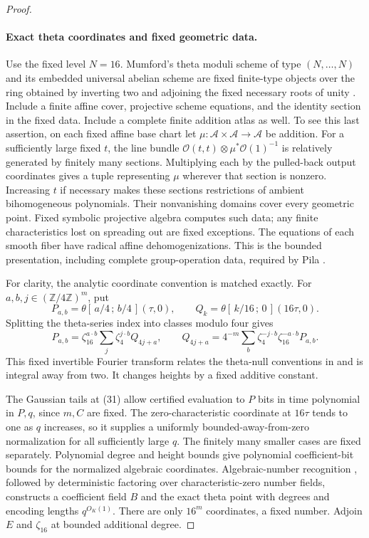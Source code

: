 \documentclass[11pt]{article}
\theoremstyle{definition}
\theoremstyle{remark}
\begin{document}
\begin{proof}
\paragraph{Exact theta coordinates and fixed geometric data.}
Use the fixed level $N=16$.  Mumford's theta moduli scheme of type
$(N,\ldots,N)$ and its embedded universal abelian scheme are fixed
finite-type objects over the ring obtained by inverting two and adjoining
the fixed necessary roots of unity
\cite[Section 6, pp.~76--84]{Mumford1967}.  Include a finite affine cover,
projective scheme equations, and the identity section in the fixed data.
Include a complete finite addition atlas as well.  To see this last
assertion, on each fixed affine base chart let
$\mu:\mathcal A\times\mathcal A\to\mathcal A$ be addition.
For a sufficiently large fixed $t$, the line bundle
$\mathcal O(t,t)\otimes\mu^*\mathcal O(1)^{-1}$ is relatively generated by
finitely many sections.  Multiplying each by the pulled-back output
coordinates gives a tuple representing $\mu$ wherever that section is
nonzero.  Increasing $t$ if necessary makes these sections restrictions of
ambient bihomogeneous polynomials.  Their nonvanishing domains cover every
geometric point.  Fixed symbolic projective algebra computes such data;
any finite characteristics lost on spreading out are fixed exceptions.
The equations of each smooth fiber have radical affine dehomogenizations.
This is the bounded presentation, including complete group-operation data,
required by Pila \cite[Section 3, pp.~752--753]{Pila1990}.

For clarity, the analytic coordinate convention is matched exactly.
For $a,b,j\in(\mathbb Z/4\mathbb Z)^m$, put
\[
 P_{a,b}=\theta[\,a/4\,;\,b/4\,](\tau,0),\qquad
 Q_k=\theta[\,k/16\,;\,0\,](16\tau,0).
\]
Splitting the theta-series index into classes modulo four gives
\[
 P_{a,b}=\zeta_{16}^{a\cdot b}
 \sum_j\zeta_4^{j\cdot b}Q_{4j+a},\qquad
 Q_{4j+a}=4^{-m}\sum_b
 \zeta_4^{-j\cdot b}\zeta_{16}^{-a\cdot b}P_{a,b}.
\]
This fixed invertible Fourier transform relates the theta-null conventions
in \cite[Section 2.3.4, p.~30]{Pazuki2012} and is integral away from two.
It changes heights by a fixed additive constant.

The Gaussian tails at (31) allow certified evaluation to $P$ bits in time
polynomial in $P,q$, since $m,C$ are fixed.  The zero-characteristic
coordinate at $16\tau$ tends to one as $q$ increases, so it supplies a
uniformly bounded-away-from-zero normalization for all sufficiently large
$q$.  The finitely many smaller cases are fixed separately.  Polynomial
degree and height bounds give polynomial coefficient-bit bounds for the
normalized algebraic coordinates.  Algebraic-number recognition
\cite[Theorem 1.19, p.~241]{KannanLenstraLovasz1988}, followed by deterministic factoring over
characteristic-zero number fields, constructs a coefficient field $B$ and
the exact theta point with degrees and encoding lengths $q^{O_K(1)}$.
There are only $16^m$ coordinates, a fixed number.  Adjoin $E$ and
$\zeta_{16}$ at bounded additional degree.


\end{proof}
\end{document}
